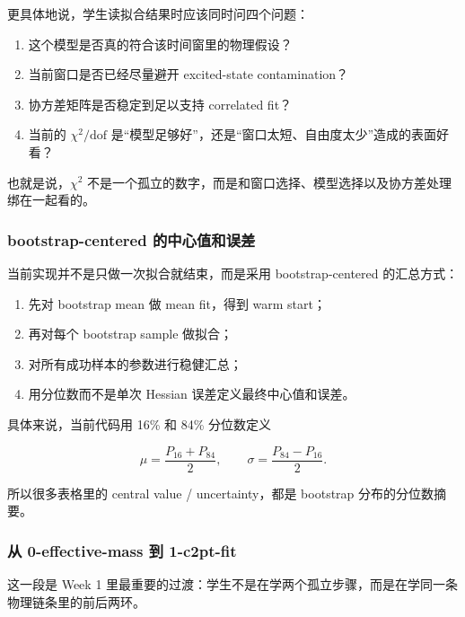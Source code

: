 \documentclass[11pt,a4paper,fontset=fandol]{ctexart}
\begin{document}
更具体地说，学生读拟合结果时应该同时问四个问题：

\begin{enumerate}[leftmargin=2em]
  \item 这个模型是否真的符合该时间窗里的物理假设？
  \item 当前窗口是否已经尽量避开 excited-state contamination？
  \item 协方差矩阵是否稳定到足以支持 correlated fit？
  \item 当前的 $\chi^2/\mathrm{dof}$ 是“模型足够好”，还是“窗口太短、自由度太少”造成的表面好看？
\end{enumerate}

也就是说，$\chi^2$ 不是一个孤立的数字，而是和窗口选择、模型选择以及协方差处理绑在一起看的。

\subsubsection{bootstrap-centered 的中心值和误差}

当前实现并不是只做一次拟合就结束，而是采用 bootstrap-centered 的汇总方式：

\begin{enumerate}[leftmargin=2em]
  \item 先对 bootstrap mean 做 mean fit，得到 warm start；
  \item 再对每个 bootstrap sample 做拟合；
  \item 对所有成功样本的参数进行稳健汇总；
  \item 用分位数而不是单次 Hessian 误差定义最终中心值和误差。
\end{enumerate}

具体来说，当前代码用 16\% 和 84\% 分位数定义

\begin{equation}
\mu = \frac{P_{16}+P_{84}}{2},
\qquad
\sigma = \frac{P_{84}-P_{16}}{2}.
\end{equation}

所以很多表格里的 central value / uncertainty，都是 bootstrap 分布的分位数摘要。

\subsubsection{从 \texorpdfstring{0-effective-mass}{0-effective-mass} 到 \texorpdfstring{1-c2pt-fit}{1-c2pt-fit}}

这一段是 Week 1 里最重要的过渡：学生不是在学两个孤立步骤，而是在学同一条物理链条里的前后两环。
\end{document}
